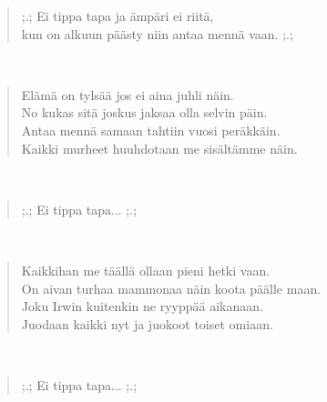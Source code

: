 \noindent\begin{minipage}{\linewidth}
\begin{verse}
	;.; Ei tippa tapa ja ämpäri ei riitä,\\
	kun on alkuun päästy niin antaa mennä vaan. ;.;\\
\end{verse}
\end{minipage}\\[10pt]
\noindent\begin{minipage}{\linewidth}
\begin{verse}
	Elämä on tylsää jos ei aina juhli näin.\\
	No kukas sitä joskus jaksaa olla selvin päin.\\
	Antaa mennä samaan tahtiin vuosi peräkkäin.\\
	Kaikki murheet huuhdotaan me sisältämme näin.\\
\end{verse}
\end{minipage}\\[10pt]
\noindent\begin{minipage}{\linewidth}
\begin{verse}
	;.; Ei tippa tapa... ;.;\\
\end{verse}
\end{minipage}\\[10pt]
\noindent\begin{minipage}{\linewidth}
\begin{verse}
	Kaikkihan me täällä ollaan pieni hetki vaan.\\
	On aivan turhaa mammonaa näin koota päälle maan.\\
	Joku Irwin kuitenkin ne ryyppää aikanaan.\\
	Juodaan kaikki nyt ja juokoot toiset omiaan.\\
\end{verse}
\end{minipage}\\[10pt]
\noindent\begin{minipage}{\linewidth}
\begin{verse}
	;.; Ei tippa tapa... ;.;\\
\end{verse}
\end{minipage}\\[10pt]
%
%
